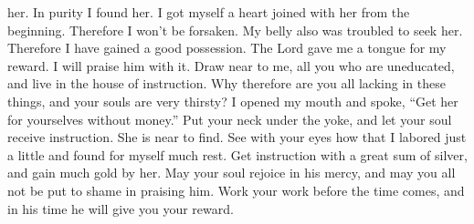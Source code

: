 her. In purity I found her. I got myself a heart joined with her from
the beginning. Therefore I won't be forsaken.  My belly
also was troubled to seek her. Therefore I have gained a good
possession.  The Lord gave me a tongue for my reward. I
will praise him with it.  Draw near to me, all you who
are uneducated, and live in the house of instruction. 
Why therefore are you all lacking in these things, and your souls are
very thirsty?  I opened my mouth and spoke, ``Get her for
yourselves without money.''  Put your neck under the
yoke, and let your soul receive instruction. She is near to find.
 See with your eyes how that I labored just a little and
found for myself much rest.  Get instruction with a great
sum of silver, and gain much gold by her.  May your soul
rejoice in his mercy, and may you all not be put to shame in praising
him.  Work your work before the time comes, and in his
time he will give you your reward.
